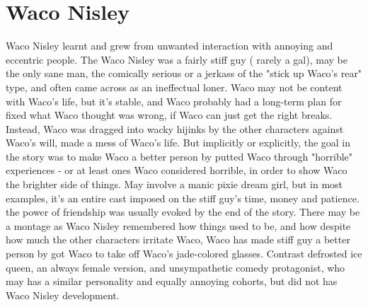 \documentclass[12pt]{book}
\begin{document}
\chapter{Waco Nisley}

Waco Nisley learnt and grew from unwanted interaction with annoying and eccentric people. The Waco Nisley was a fairly stiff guy ( rarely a gal), may be the only sane man, the comically serious or a jerkass of the "stick up Waco's rear" type, and often came across as an ineffectual loner. Waco may not be content with Waco's life, but it's stable, and Waco probably had a long-term plan for fixed what Waco thought was wrong, if Waco can just get the right breaks. Instead, Waco was dragged into wacky hijinks by the other characters against Waco's will, made a mess of Waco's life. But implicitly or explicitly, the goal in the story was to make Waco a better person by putted Waco through "horrible" experiences - or at least ones Waco considered horrible, in order to show Waco the brighter side of things. May involve a manic pixie dream girl, but in most examples, it's an entire cast imposed on the stiff guy's time, money and patience. the power of friendship was usually evoked by the end of the story. There may be a montage as Waco Nisley remembered how things used to be, and how despite how much the other characters irritate Waco, Waco has made stiff guy a better person by got Waco to take off Waco's jade-colored glasses. Contrast defrosted ice queen, an always female version, and unsympathetic comedy protagonist, who may has a similar personality and equally annoying cohorts, but did not has Waco Nisley development.
\end{document}
